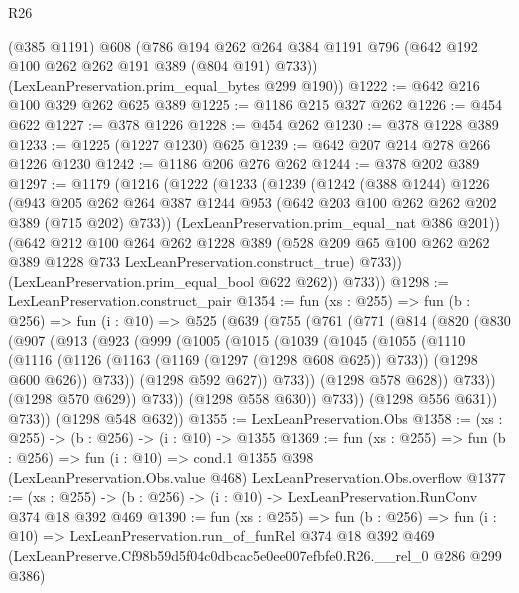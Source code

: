 \begin{lexlean}{R26}
\begin{coremodule}
      (@385 @1191)
      @608
      (@786 @194 @262 @264 @384 @1191 @796 (@642 @192 @100 @262 @262 @191 @389 (@804 @191) @733))
      (LexLeanPreservation.prim_equal_bytes @299 @190))
@1222 := @642 @216 @100 @329 @262 @625 @389
@1225 := @1186 @215 @327 @262
@1226 := @454 @622
@1227 := @378 @1226
@1228 := @454 @262
@1230 := @378 @1228 @389
@1233 := @1225 (@1227 @1230) @625
@1239 := @642 @207 @214 @278 @266 @1226 @1230
@1242 := @1186 @206 @276 @262
@1244 := @378 @202 @389
@1297 := @1179
    (@1216
      (@1222
        (@1233
          (@1239
            (@1242
              (@388 @1244)
              @1226
              (@943
                @205
                @262
                @264
                @387
                @1244
                @953
                (@642 @203 @100 @262 @262 @202 @389 (@715 @202) @733))
              (LexLeanPreservation.prim_equal_nat @386 @201))
            (@642
              @212
              @100
              @264
              @262
              @1228
              @389
              (@528 @209 @65 @100 @262 @262 @389 @1228 @733 LexLeanPreservation.construct_true)
              @733))
          (LexLeanPreservation.prim_equal_bool @622 @262))
        @733))
@1298 := LexLeanPreservation.construct_pair
@1354 := fun (xs : @255) =>
  fun (b : @256) =>
  fun (i : @10) =>
  @525
    (@639
      (@755
        (@761
          (@771
            (@814
              (@820
                (@830
                  (@907
                    (@913
                      (@923
                        (@999
                          (@1005
                            (@1015
                              (@1039
                                (@1045
                                  (@1055
                                    (@1110
                                      (@1116
                                        (@1126
                                          (@1163 (@1169 (@1297 (@1298 @608 @625)) @733))
                                          (@1298 @600 @626))
                                        @733))
                                    (@1298 @592 @627))
                                  @733))
                              (@1298 @578 @628))
                            @733))
                        (@1298 @570 @629))
                      @733))
                  (@1298 @558 @630))
                @733))
            (@1298 @556 @631))
          @733))
      (@1298 @548 @632))
@1355 := LexLeanPreservation.Obs
@1358 := (xs : @255) -> (b : @256) -> (i : @10) -> @1355
@1369 := fun (xs : @255) =>
  fun (b : @256) =>
  fun (i : @10) =>
  cond.{1} @1355 @398 (LexLeanPreservation.Obs.value @468) LexLeanPreservation.Obs.overflow
@1377 := (xs : @255) -> (b : @256) -> (i : @10) -> LexLeanPreservation.RunConv @374 @18 @392 @469
@1390 := fun (xs : @255) =>
  fun (b : @256) =>
  fun (i : @10) =>
  LexLeanPreservation.run_of_funRel
    @374
    @18
    @392
    @469
    (LexLeanPreserve.Cf98b59d5f04c0dbcac5e0ee007efbfe0.R26.__rel_0 @286 @299 @386)
\end{coremodule}
\end{lexlean}
